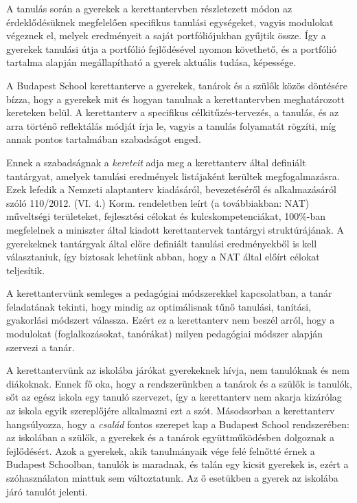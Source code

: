 A tanulás során a gyerekek a kerettantervben részletezett módon az érdeklődésüknek megfelelően specifikus tanulási egységeket, vagyis modulokat végeznek el, melyek eredményeit a saját portfóliójukban gyűjtik össze. Így a gyerekek tanulási útja a portfólió fejlődésével nyomon követhető, és a portfólió tartalma alapján megállapítható a gyerek aktuális tudása, képessége.

A Budapest School kerettanterve a gyerekek, tanárok és a szülők közös döntésére bízza, hogy a gyerekek mit és hogyan tanulnak a kerettantervben meghatározott kereteken belül. A kerettanterv a specifikus célkitűzés-tervezés, a tanulás, és az arra történő reflektálás módját írja le, vagyis a tanulás folyamatát rögzíti, míg annak pontos tartalmában szabadságot enged.

Ennek a szabadságnak a \emph{kereteit} adja meg a kerettanterv által definiált tantárgyat, amelyek tanulási eredmények listájaként kerültek megfogalmazásra. Ezek lefedik a Nemzeti alaptanterv kiadásáról, bevezetéséről és alkalmazásáról szóló 110/2012. (VI. 4.) Korm. rendeletben leírt (a továbbiakban: NAT) műveltségi területeket, fejlesztési célokat és kulcskompetenciákat, 100\%-ban megfelelnek a miniszter által kiadott kerettantervek tantárgyi struktúrájának. A gyerekeknek tantárgyak által előre definiált tanulási eredményekből is kell választaniuk, így biztosak lehetünk abban, hogy a NAT által előírt célokat teljesítik.

A kerettantervünk semleges a pedagógiai módszerekkel kapcsolatban, a tanár feladatának tekinti, hogy mindig az optimálisnak tűnő tanulási, tanítási, gyakorlási módszert válassza. Ezért ez a kerettanterv nem beszél arról, hogy a modulokat (foglalkozásokat, tanórákat) milyen pedagógiai módszer alapján szervezi a tanár.

A kerettantervünk az iskolába járókat gyerekeknek hívja, nem tanulóknak és nem diákoknak. Ennek fő oka, hogy a rendszerünkben a tanárok és a szülők is tanulók, sőt az egész iskola egy tanuló szervezet, így a kerettanterv nem akarja  kizárólag az iskola egyik szereplőjére alkalmazni ezt a szót. Másodsorban a kerettanterv hangsúlyozza, hogy a \emph{család} fontos szerepet kap a Budapest School rendszerében: az iskolában a szülők, a gyerekek és a tanárok együttműködésben dolgoznak a fejlődésért. Azok a gyerekek, akik tanulmányaik vége felé felnőtté érnek a Budapest Schoolban, tanulók is maradnak, és talán egy kicsit gyerekek is, ezért a szóhasználaton miattuk sem változtatunk. Az ő esetükben a gyerek az iskolába járó tanulót jelenti.


